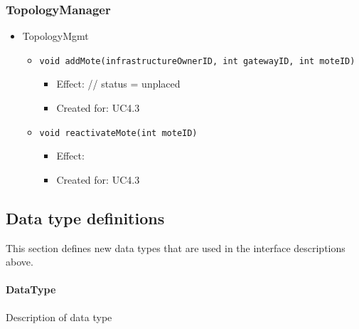     \subsubsection{TopologyManager}
        \begin{itemize}
        	\item TopologyMgmt
        	\begin{itemize}
        		\item \texttt{void addMote(infrastructureOwnerID, int gatewayID, int moteID)}
        		\begin{itemize}
        			\item Effect: // status = unplaced
        			\item Created for: UC4.3
        		\end{itemize}
                \item \texttt{void reactivateMote(int moteID)}
                    \begin{itemize}
                        \item Effect:
                        \item Created for: UC4.3
                    \end{itemize}
        	\end{itemize}
        \end{itemize}

\subsection{Data type definitions}
    This section defines new data types that are used in the interface descriptions above.

    \paragraph{DataType}
        Description of data type
